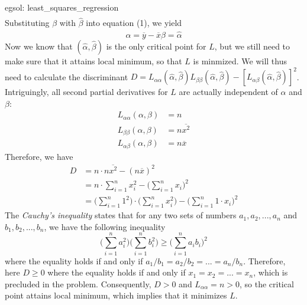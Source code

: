 \begin{egsol}[]{egsol: least_squares_regression}
\begin{align*}
    \end{align*}
    Substituting $\beta$ with $\hat{\beta}$ into equation (1), we yield
    \[\alpha = \overline{y} - \overline{x}\hat{\beta} = \hat{\alpha}\]
    Now we know that $(\hat{\alpha}, \hat{\beta})$ is the only critical point for $L$, but we still need to make sure that it attains local minimum, so that $L$ is minmized.  We will thus need to calculate the discriminant $D = L_{\alpha\alpha}(\hat{\alpha}, \hat{\beta})L_{\beta\beta}(\hat{\alpha}, \hat{\beta}) - [L_{\alpha\beta}(\hat{\alpha}, \hat{\beta})]^2$.  Intriguingly, all second partial derivatives for $L$ are actually independent of $\alpha$ and $\beta$:
    \begin{align*}
        L_{\alpha\alpha}(\alpha, \beta) &= n\\
        L_{\beta\beta}(\alpha, \beta) &= n\overline{x^2}\\
        L_{\alpha\beta}(\alpha, \beta) &= n\overline{x}
    \end{align*}
    Therefore, we have
    \begin{align*}
        D &= n \cdot n \overline{x^2} - (n\overline{x})^2\\
        &= n \cdot \sum_{i=1}^n x_i^2 - \Big(\sum_{i=1}^n x_i\Big)^2\\
        &=  \Big(\sum_{i=1}^n 1^2\Big) \cdot \Big(\sum_{i=1}^n x_i^2\Big) - \Big(\sum_{i=1}^n 1 \cdot x_i\Big)^2
    \end{align*}
    The \textit{Cauchy's inequality} states that for any two sets of numbers $a_1, a_2, ..., a_n$ and $b_1, b_2, ..., b_n$, we have the following inequality
    \[\Big(\sum_{i=1}^n a_i^2\Big)\Big(\sum_{i=1}^n b_i^2\Big) \ge \Big(\sum_{i=1}^n a_i b_i\Big)^2\]
    where the equality holds if and only if $a_1/b_1 = a_2/b_2 = ... = a_n/b_n$.  Therefore, here $D \ge 0$ where the equality holds if and only if $x_1 = x_2 = ... = x_n$, which is precluded in the problem.  Consequently, $D > 0$ and $L_{\alpha\alpha} = n > 0$, so the critical point attains local minimum, which implies that it minimizes $L$.
\end{egsol}
